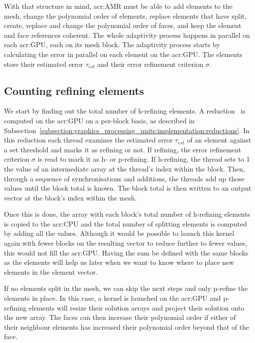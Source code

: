 With that structure in mind, \acrlong{acr:AMR} must be able to add elements to the mesh, change the
polynomial order of elements, replace elements that have split, create, replace and change the
polynomial order of faces, and keep the element and face references coherent. The whole adaptivity
process happens in parallel on each \acrshort{acr:GPU}, each on its mesh block. The adaptivity
process starts by calculating the error in parallel on each element on the \acrshort{acr:GPU}. The
elements store their estimated error \(\tau_{est}\) and their error refinement criterion \(\sigma
\).

\subsection{Counting refining elements}\label{subsection:adaptive_mesh_refinement:implementation:counting_refining_elements}

We start by finding out the total number of h-refining elements. A reduction~\cite{Harris2007} is
computed on the \acrshort{acr:GPU} on a per-block basis, as described in
Subsection~\ref{subsection:graphics_processing_units:implementation:reductions}. In this reduction
each thread examines the estimated error \(\tau_{est}\) of an element against a set threshold and
marks it as refining or not. If refining, the error refinement criterion \(\sigma \) is read to mark
it as h- or p-refining. If h-refining, the thread sets to 1 the value of an intermediate array at the
thread's index within the block. Then, through a sequence of synchronisations and additions, the
threads add up those values until the block total is known. The block total is then written to an
output vector at the block's index within the mesh.

Once this is done, the array with each block's total number of h-refining elements is copied to the
\acrshort{acr:CPU} and the total number of splitting elements is computed by adding all the values.
Although it would be possible to launch this kernel again with fewer blocks on the resulting vector
to reduce further to fewer values, this would not fill the \acrshort{acr:GPU}. Having the sum be
defined with the same blocks as the elements will help us later when we want to know where to place
new elements in the element vector.

If no elements split in the mesh, we can skip the next steps and only p-refine the elements in
place. In this case, a kernel is launched on the \acrshort{acr:GPU} and p-refining elements will
resize their solution arrays and project their solution onto the new array. The faces can then
increase their polynomial order if either of their neighbour elements has increased their polynomial
order beyond that of the face. 

